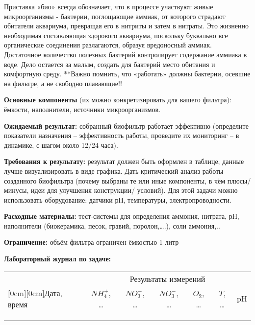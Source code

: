 
Приставка «био» всегда обозначает, что в процессе участвуют живые микроорганизмы - бактерии, поглощающие аммиак, от которого страдают обитатели аквариума, превращая его в нитриты и затем в нитраты.
Это жизненно необходимая составляющая здорового аквариума, поскольку буквально все органические соединения разлагаются, образуя вредоносный аммиак. Достаточное количество полезных бактерий контролирует содержание аммиака в воде. Дело остается за малым, создать для бактерий место обитания и комфортную среду. 
**Важно помнить, что «работать» должны бактерии, осевшие на фильтре, а не свободно плавающие!!

\textbf{Основные компоненты} (их можно конкретизировать для вашего фильтра): ёмкости, наполнители, источники микроорганизмов.

\textbf{Ожидаемый результат:} собранный биофильтр работает эффективно (определите показатели назначения – эффективность работы, проведите их мониторинг – в динамике, с шагом около 12/24 часа).

\textbf{Требования к результату:} результат должен быть оформлен в таблице, данные лучше визуализировать в виде графика. Дать критический анализ работы созданного биофильтра (почему выбраны те или иные компоненты, в чём плюсы/ минусы, идеи для улучшения конструкции/ условий).
Для этой задачи можно использовать оборудование: датчики рН, температуры, электропроводности.

\textbf{Расходные материалы:} тест-системы для определения аммония, нитрата, рН, наполнители (биокерамика, песок, гравий, поролон,….), соли аммония,..

\textbf{Ограничение:} объём фильтра ограничен ёмкостью 1 литр

\begin{center}
    \textbf{Лабораторный журнал по задаче:}
\end{center}

\begin{table}[H]
    \begin{center}
        \begin{tabular}{|p{3cm}|c|c|c|c|c|c|}
        \hline
        & \multicolumn{6}{c|}{Результаты измерений} \\
        \cline{2-7}
        \raisebox{1.5ex}[0cm][0cm]{Дата, время}
        & $NH_4^+$, \dots & $NO_3^-$, \dots & $NO_3^-$, \dots & $O_2$, \dots & $T$, \dots & pH\\
        \hline
         &  &  & & & & \\
        \hline
        &  &  & & & & \\
        \hline
        &  &  & & & & \\
        \hline
        \end{tabular}
    \end{center}
\end{table}

